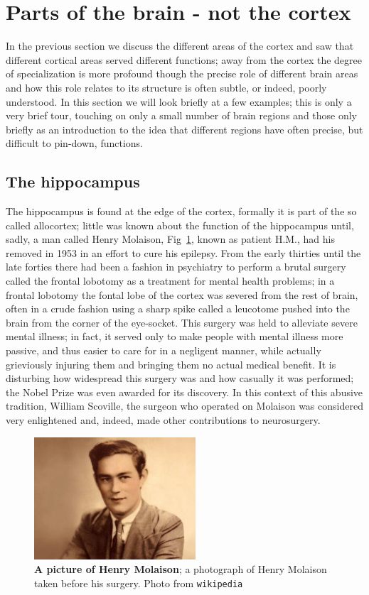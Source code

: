 \documentclass[12pt]{article}
\begin{document}
\section*{Parts of the brain - not the cortex}

In the previous section we discuss the different areas of the cortex
and saw that different cortical areas served different functions; away
from the cortex the degree of specialization is more profound though
the precise role of different brain areas and how this role relates to
its structure is often subtle, or indeed, poorly understood. In this
section we will look briefly at a few examples; this is only a very
brief tour, touching on only a small number of brain regions and those
only briefly as an introduction to the idea that different regions
have often precise, but difficult to pin-down, functions.

\subsection*{The hippocampus}

The hippocampus is found at the edge of the cortex, formally it is
part of the so called allocortex; little was known about the function
of the hippocampus until, sadly, a man called Henry Molaison,
Fig~\ref{fig_hm}, known as patient H.M., had his removed in 1953 in an
effort to cure his epilepsy. From the early thirties until the late
forties there had been a fashion in psychiatry to perform a brutal
surgery called the frontal lobotomy as a treatment for mental health
problems; in a frontal lobotomy the fontal lobe of the cortex was
severed from the rest of brain, often in a crude fashion using a sharp
spike called a leucotome pushed into the brain from the corner of the
eye-socket. This surgery was held to alleviate severe mental illness;
in fact, it served only to make people with mental illness more
passive, and thus easier to care for in a negligent manner, while
actually grieviously injuring them and bringing them no actual medical
benefit. It is disturbing how widespread this surgery was and how
casually it was performed; the Nobel Prize was even awarded for its
discovery. In this context of this abusive tradition, William
Scoville, the surgeon who operated on Molaison was considered very
enlightened and, indeed, made other contributions to neurosurgery.


\begin{figure}[tbhp]
  \begin{center}
  \includegraphics[width=6cm]{HM.jpg}
\end{center}
  \caption{\textbf{A picture of Henry Molaison}; a photograph of Henry Molaison taken before his surgery. Photo from
    \texttt{wikipedia}\label{fig_hm}}
\end{figure}
\end{document}
